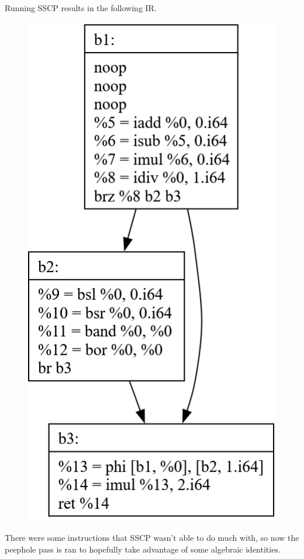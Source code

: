 \documentclass[11pt, a4paper, titlepage]{article}
\begin{document}
Running SSCP results in the following IR.

\begin{figure}[H]
  \centering
  \includegraphics[scale=0.3]{images/i22.png}
\end{figure}

There were some instructions that SSCP wasn't able to do much with, so now the peephole pass is ran to hopefully take advantage of some algebraic identities.
\end{document}
